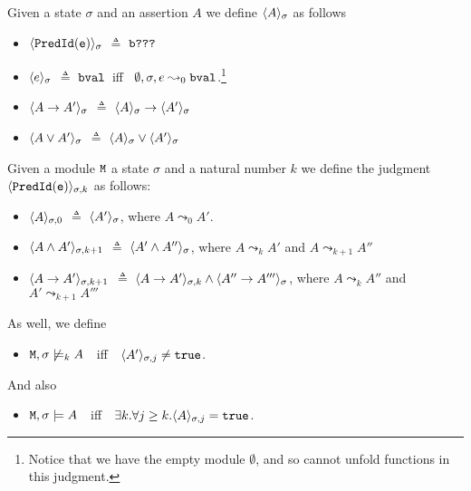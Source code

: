 \documentclass[acmsmall,screen]{acmart}
\begin{document}
 \begin{definition}
\label{def:assertion:unfold}
Given   a state $\sigma$ and an assertion $A$ we define  ${\langle{ {A}}\rangle_{\sigma}}$ as follows

\begin{itemize}
\item
${\langle{ { {\mbox{\tt{PredId}}}({\mbox{\tt{e}}})}}\rangle_{\sigma}}$  $\triangleq$    ${\mbox{\tt{b???}}}$
\item
 ${\langle{ {e}}\rangle_{\sigma}}$  $\triangleq$ ${\mbox{\tt{bval}}}$\ iff \  $\emptyset, \sigma, e \leadsto _0 {\mbox{\tt{bval}}}$.\footnote{Notice that we have the empty module $\emptyset$,
and so cannot unfold functions in this judgment.}
\item
${\langle{ {A \rightarrow A'}}\rangle_{\sigma}}$  $\triangleq$    ${\langle{ {A}}\rangle_{\sigma}}  \rightarrow {\ensuremath{\langle{ {A'}}\rangle_{\sigma}}}$
\item
${\langle{ {A \vee A'}}\rangle_{\sigma}}$  $\triangleq$    ${\langle{ {A}}\rangle_{\sigma}}  \vee {\ensuremath{\langle{ {A'}}\rangle_{\sigma}}}$%
\end{itemize}

 Given a module ${\mbox{\tt{M}}}$ a state $\sigma$ and a natural number $k$ we define the judgment  ${\langle{ { {\mbox{\tt{PredId}}}({\mbox{\tt{e}}})}}\rangle_{\sigma,k}}$   as follows:

\begin{itemize}
\item
 ${\langle{ { A}}\rangle_{\sigma,0}}$ $\triangleq$   ${\langle{ {A'}}\rangle_{\sigma}}$, where $A \leadsto_0 A'$.
 \item
 ${\langle{ { A\wedge A'}}\rangle_{\sigma,k+1}}$ $\triangleq$   ${\langle{ {A' \wedge A''}}\rangle_{\sigma}}$, where $A \leadsto_k A'$ and $A \leadsto_{k+1} A''$

 \item
 ${\langle{ { A\rightarrow A'}}\rangle_{\sigma,k+1}}$ $\triangleq$   ${\langle{ { A\rightarrow A'}}\rangle_{\sigma,k}} \wedge {\ensuremath{\langle{ {A''\rightarrow A'''}}\rangle_{\sigma}}} $, where $A \leadsto_k A''$ and $A' \leadsto_{k+1} A'''$
\end{itemize}

 As well, we define
 \begin{itemize}
  \item
 ${\mbox{\tt{M}}}, \sigma \not\models_k A$\ \  iff\ \  ${\langle{ {A'}}\rangle_{\sigma,j}} \neq {\mbox{\tt{true}}}$.
  \end{itemize}

And also
\begin{itemize}
\item
${\mbox{\tt{M}}}, \sigma \models  A$\ \  iff\ \  $\exists k.\forall j\geq k.  {\langle{ {A}}\rangle_{\sigma,j}} = {\mbox{\tt{true}}}$.
\end{itemize}

\end{definition}
\end{document}
